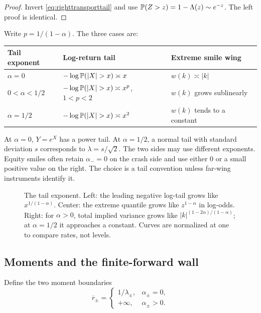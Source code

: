\begin{proof}
Invert \eqref{eq:righttransporttail} and use
$\mathbb{P}(Z>z)=1-\Lambda(z)\sim e^{-z}$.  The left proof is identical.
\end{proof}

Write $p=1/(1-\alpha)$.  The three cases are:
\begin{center}
\begin{tabular}{@{}lll@{}}
\toprule
Tail exponent & Log-return tail & Extreme smile wing \\
\midrule
$\alpha=0$ & $-\log\Prob(|X|>x)\asymp x$ & $w(k)\asymp |k|$ \\
$0<\alpha<1/2$ & $-\log\Prob(|X|>x)\asymp x^p$, $1<p<2$
& $w(k)$ grows sublinearly \\
$\alpha=1/2$ & $-\log\Prob(|X|>x)\asymp x^2$ & $w(k)$ tends to a constant \\
\bottomrule
\end{tabular}
\end{center}
At $\alpha=0$, $Y=e^X$ has a power tail.  At $\alpha=1/2$, a normal tail
with standard deviation $s$ corresponds to $\lambda=s/\sqrt2$.
The two sides may use different exponents.  Equity smiles often retain
$\alpha_-=0$ on the crash side and use either $0$ or a small positive value
on the right.  The choice is a tail convention unless far-wing instruments
identify it.

\begin{figure}[htbp]
\centering
{}
\caption{The tail exponent.  Left: the leading negative log-tail grows like
$x^{1/(1-\alpha)}$.  Center: the extreme quantile grows like
$z^{1-\alpha}$ in log-odds.  Right: for $\alpha>0$, total implied variance
grows like $|k|^{(1-2\alpha)/(1-\alpha)}$; at $\alpha=1/2$ it approaches a
constant.  Curves are normalized at one to compare rates, not levels.}
\label{fig:tailfamily}
\end{figure}

\subsection{Moments and the finite-forward wall}

Define the two moment boundaries
\begin{equation}
\overline r_\pm=
\begin{cases}
1/\lambda_\pm,&\alpha_\pm=0,\\
+\infty,&\alpha_\pm>0.
\end{cases}
\label{eq:momentboundaries}
\end{equation}

